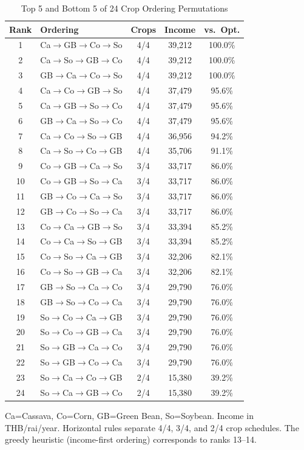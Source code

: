 \documentclass[journal]{IEEEtran}
\begin{document}
\begin{table}[htbp]
  \centering
  \caption{Top 5 and Bottom 5 of 24 Crop Ordering Permutations}
  \label{tab:permutations}
  \begin{tabular}{clccc}
    \toprule
    \textbf{Rank} & \textbf{Ordering} & \textbf{Crops} & \textbf{Income} & \textbf{vs.\ Opt.} \\
    \midrule
    1  & Ca$\to$GB$\to$Co$\to$So & 4/4 & 39,212 & 100.0\% \\
    2  & Ca$\to$So$\to$GB$\to$Co & 4/4 & 39,212 & 100.0\% \\
    3  & GB$\to$Ca$\to$Co$\to$So & 4/4 & 39,212 & 100.0\% \\
    4  & Ca$\to$Co$\to$GB$\to$So & 4/4 & 37,479 & 95.6\% \\
    5  & Ca$\to$GB$\to$So$\to$Co & 4/4 & 37,479 & 95.6\% \\
    6  & GB$\to$Ca$\to$So$\to$Co & 4/4 & 37,479 & 95.6\% \\
    7  & Ca$\to$Co$\to$So$\to$GB & 4/4 & 36,956 & 94.2\% \\
    8  & Ca$\to$So$\to$Co$\to$GB & 4/4 & 35,706 & 91.1\% \\
    \midrule
    9  & Co$\to$GB$\to$Ca$\to$So & 3/4 & 33,717 & 86.0\% \\
    10 & Co$\to$GB$\to$So$\to$Ca & 3/4 & 33,717 & 86.0\% \\
    11 & GB$\to$Co$\to$Ca$\to$So & 3/4 & 33,717 & 86.0\% \\
    12 & GB$\to$Co$\to$So$\to$Ca & 3/4 & 33,717 & 86.0\% \\
    13 & Co$\to$Ca$\to$GB$\to$So & 3/4 & 33,394 & 85.2\% \\
    14 & Co$\to$Ca$\to$So$\to$GB & 3/4 & 33,394 & 85.2\% \\
    15 & Co$\to$So$\to$Ca$\to$GB & 3/4 & 32,206 & 82.1\% \\
    16 & Co$\to$So$\to$GB$\to$Ca & 3/4 & 32,206 & 82.1\% \\
    17 & GB$\to$So$\to$Ca$\to$Co & 3/4 & 29,790 & 76.0\% \\
    18 & GB$\to$So$\to$Co$\to$Ca & 3/4 & 29,790 & 76.0\% \\
    19 & So$\to$Co$\to$Ca$\to$GB & 3/4 & 29,790 & 76.0\% \\
    20 & So$\to$Co$\to$GB$\to$Ca & 3/4 & 29,790 & 76.0\% \\
    21 & So$\to$GB$\to$Ca$\to$Co & 3/4 & 29,790 & 76.0\% \\
    22 & So$\to$GB$\to$Co$\to$Ca & 3/4 & 29,790 & 76.0\% \\
    \midrule
    23 & So$\to$Ca$\to$Co$\to$GB & 2/4 & 15,380 & 39.2\% \\
    24 & So$\to$Ca$\to$GB$\to$Co & 2/4 & 15,380 & 39.2\% \\
    \bottomrule
  \end{tabular}
  \vspace{6pt}
  \par\raggedright\scriptsize Ca=Cassava, Co=Corn, GB=Green Bean, So=Soybean. Income in THB/rai/year. Horizontal rules separate 4/4, 3/4, and 2/4 crop schedules. The greedy heuristic (income-first ordering) corresponds to ranks 13--14.
\end{table}
\end{document}
